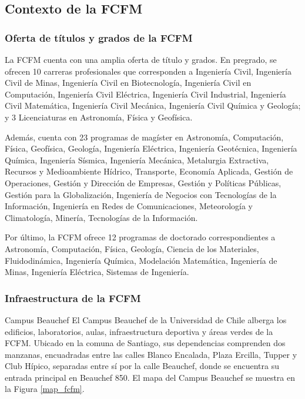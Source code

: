 \subsection{Contexto de la FCFM}

\subsubsection{Oferta de títulos y grados de la FCFM}

La FCFM cuenta con una amplia oferta de título y grados. En pregrado, se ofrecen 10 carreras
profesionales que corresponden a Ingeniería Civil, Ingeniería Civil de Minas, Ingeniería Civil
en Biotecnología, Ingeniería Civil en Computación, Ingeniería Civil Eléctrica, Ingeniería Civil
Industrial, Ingeniería Civil Matemática, Ingeniería Civil Mecánica, Ingeniería Civil Química y
Geología; y 3 Licenciaturas en Astronomía, Física y Geofísica.

Además, cuenta con 23 programas de magíster en Astronomía, Computación, Física,
Geofísica, Geología, Ingeniería Eléctrica, Ingeniería Geotécnica, Ingeniería Química, Ingeniería
Sísmica, Ingeniería Mecánica, Metalurgia Extractiva, Recursos y Medioambiente Hídrico,
Transporte, Economía Aplicada, Gestión de Operaciones, Gestión y Dirección de Empresas,
Gestión y Políticas Públicas, Gestión para la Globalización, Ingeniería de Negocios con
Tecnologías de la Información, Ingeniería en Redes de Comunicaciones, Meteorología y
Climatología, Minería, Tecnologías de la Información.

Por último, la FCFM ofrece 12 programas de doctorado correspondientes a Astronomía,
Computación, Física, Geología, Ciencia de los Materiales, Fluidodinámica, Ingeniería Química,
Modelación Matemática, Ingeniería de Minas, Ingeniería Eléctrica, Sistemas de Ingeniería.

\subsubsection{Infraestructura de la FCFM} \label{infra_fcfm}

Campus Beauchef El Campus Beauchef de la Universidad de Chile alberga los edificios,
laboratorios, aulas, infraestructura deportiva y áreas verdes de la FCFM. Ubicado en la comuna
de Santiago, sus dependencias comprenden dos manzanas, encuadradas entre las calles Blanco
Encalada, Plaza Ercilla, Tupper y Club Hípico, separadas entre sí por la calle Beauchef, donde se
encuentra su entrada principal en Beauchef 850. El mapa del Campus Beauchef se muestra en la
Figura \ref{map_fcfm}.

